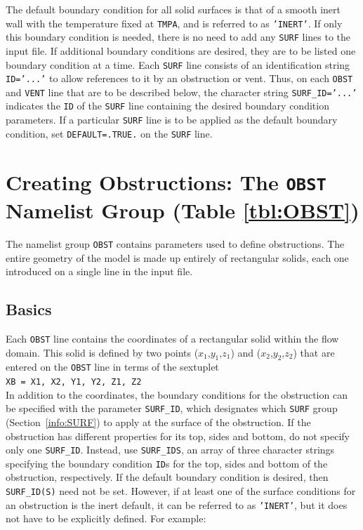 \documentclass[11pt]{book}
\newcommand{\ct}{\tt\small}
\begin{document}
The default boundary condition for all solid surfaces is that of a smooth
inert wall with the temperature fixed at {\ct TMPA}, and is referred to as {\ct 'INERT'}. If only this
boundary condition is needed, there is no need to add any {\ct SURF} lines
to the input file. If additional boundary conditions are desired,
they are to be listed one boundary condition at a time.
Each {\ct SURF} line consists of an identification string {\ct ID='...'} to
allow references to it by an obstruction or vent. Thus, on each
{\ct OBST} and {\ct VENT} line that are to be described below, the character string {\ct SURF\_ID='...'}
indicates the {\ct ID} of the {\ct SURF} line containing the desired boundary
condition parameters. If a particular {\ct SURF} line is to be applied
as the default boundary condition,
set {\ct DEFAULT=.TRUE.} on the {\ct SURF} line.




\section{Creating Obstructions: The \texorpdfstring{{\tt OBST}}{OBST} Namelist Group (Table \ref{tbl:OBST})}
\label{info:OBST}

The namelist group {\ct OBST} contains parameters used to define obstructions. The entire geometry of the model is made up entirely
of rectangular solids, each one introduced on a single line in the input file.

\subsection{Basics}
\label{info:OBST_Basics}

Each {\ct OBST} line contains the coordinates of a rectangular
solid within the flow domain. This solid is defined by two points
($x_1$,$y_1$,$z_1$) and ($x_2$,$y_2$,$z_2$) that are entered on the
{\ct OBST} line in terms of the sextuplet \\
{\ct XB = X1, X2, Y1, Y2, Z1, Z2} \\
In addition to the coordinates, the boundary conditions for the obstruction
can be specified with the parameter {\ct SURF\_ID}, which designates which
{\ct SURF} group (Section~\ref{info:SURF}) to apply at the surface of the obstruction.
If the obstruction has different properties for its top,
sides and bottom, do not specify only one {\ct SURF\_ID}. Instead, use {\ct SURF\_IDS}, an array of three character
strings specifying the boundary condition {\ct ID}s for the top,
sides and bottom of the obstruction, respectively.
If the default
boundary condition is desired, then {\ct SURF\_ID(S)} need not be set.
However, if at least one of the surface conditions for an
obstruction is the inert default, it can be referred to as {\ct 'INERT'}, but it does not have to be explicitly defined.
For example:
\end{document}

